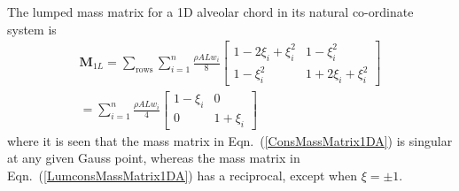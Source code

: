 The lumped mass matrix for a 1D alveolar chord in its natural co-ordinate system is 
\begin{multline}
\mathbf{M}_{1L} = \sum_{\text{rows}} \sum_{i=1}^n \frac{\rho A L w_i}{8} \begin{bmatrix}
1 - 2\xi_i + \xi_i^2 & 1 - \xi_i^2 \\
1 - \xi_i^2 & 1 + 2 \xi_i + \xi_i^2
\end{bmatrix} \\
= \sum_{i=1}^n \frac{\rho A L w_i}{4} \begin{bmatrix} 
1 - \xi_i & 0 \\ 0 & 1 + \xi_i \end{bmatrix}
\label{LumconsMassMatrix1DA}
\end{multline}
where it is seen that the mass matrix in Eqn.~(\ref{ConsMassMatrix1DA}) is singular at any given Gauss point, whereas the mass matrix in Eqn.~(\ref{LumconsMassMatrix1DA}) has a reciprocal, except when $\xi = \pm 1$. 

